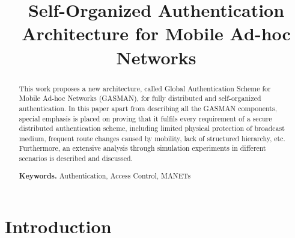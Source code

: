 \documentclass[conference]{IEEEtran}
\begin{document}
\title{Self-Organized Authentication Architecture for Mobile Ad-hoc Networks}






\author{



}

\maketitle


\begin{abstract}
This work proposes a new architecture, called Global Authentication Scheme for Mobile Ad-hoc Networks (GASMAN), for fully distributed and self-organized authentication. In this paper apart from describing  all the GASMAN components, special emphasis is placed on proving that it fulfils every requirement of a secure distributed authentication scheme, including limited physical protection of broadcast medium, frequent route changes caused by mobility, lack of structured hierarchy, etc. Furthermore, an extensive analysis through simulation experiments in different scenarios is described and discussed.


{\bf Keywords.} Authentication, Access Control, MANETs
\end{abstract}

\section{Introduction}
\label{Sec:Intro}
\end{document}
